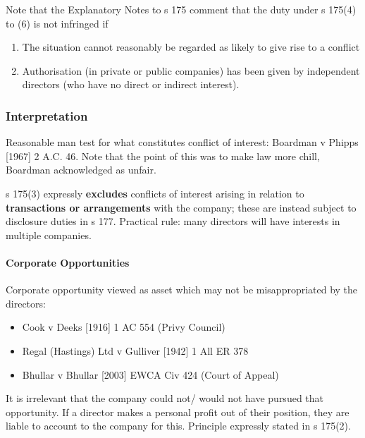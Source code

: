 \documentclass[
]{article}
\providecommand{\tightlist}{%
  \setlength{\itemsep}{0pt}\setlength{\parskip}{0pt}}
\begin{document}
Note that the Explanatory Notes to s 175 comment that the duty under s
175(4) to (6) is not infringed if

\begin{enumerate}
\tightlist
\item
  The situation cannot reasonably be regarded as likely to give rise to
  a conflict
\item
  Authorisation (in private or public companies) has been given by
  independent directors (who have no direct or indirect interest).
\end{enumerate}

\hypertarget{interpretation-2}{%
\subsubsection{Interpretation}\label{interpretation-2}}

Reasonable man test for what constitutes conflict of interest: Boardman
v Phipps {[}1967{]} 2 A.C. 46. Note that the point of this was to make
law more chill, Boardman acknowledged as unfair.

s 175(3) expressly \textbf{excludes} conflicts of interest arising in
relation to \textbf{transactions or arrangements} with the company;
these are instead subject to disclosure duties in s 177. Practical rule:
many directors will have interests in multiple companies.

\hypertarget{corporate-opportunities}{%
\paragraph{Corporate Opportunities}\label{corporate-opportunities}}

Corporate opportunity viewed as asset which may not be misappropriated
by the directors:

\begin{itemize}
\tightlist
\item
  Cook v Deeks {[}1916{]} 1 AC 554 (Privy Council)
\item
  Regal (Hastings) Ltd v Gulliver {[}1942{]} 1 All ER 378
\item
  Bhullar v Bhullar {[}2003{]} EWCA Civ 424 (Court of Appeal)
\end{itemize}

It is irrelevant that the company could not/ would not have pursued that
opportunity. If a director makes a personal profit out of their
position, they are liable to account to the company for this. Principle
expressly stated in s 175(2).
\end{document}
